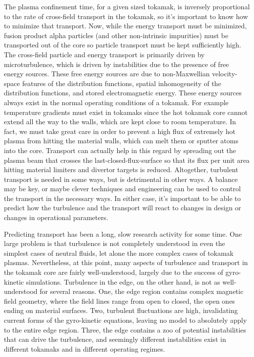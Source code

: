 The plasma confinement time, for a given sized tokamak, is inversely proportional to the rate of cross-field transport in the tokamak, so it's important to know how to minimize that
transport. Now, while the energy transport must be minimized, fusion product alpha particles (and other non-intrinsic impurities) must be transported out of the core so particle transport
must be kept sufficiently high. The cross-field particle and energy transport is primarily driven by microturbulence, which is driven by instabilities due to the presence of free energy sources.
These free energy sources are due to non-Maxwellian velocity-space features of the distribution functions, spatial inhomogeneity of the distribution functions, and stored electromagnetic energy.
These energy sources always exist in the normal operating conditions of a tokamak. For example temperature gradients must exist in tokamaks
since the hot tokamak core cannot extend all the way to the walls, which are kept close to room temperature. In fact, we must take great care in order to prevent a high flux of extremely
hot plasma from hitting the material walls, which can melt them or sputter atoms into the core. 
Transport can actually help in this regard by spreading out the plasma beam that crosses the last-closed-flux-surface so that its flux
per unit area hitting material limiters and divertor targets is reduced. Altogether, turbulent transport is needed in some ways, but is detrimental in other ways. A balance may be key,
or maybe clever techniques and engineering can be used to control the transport in the necessary ways. In either case, it's important to be able to predict how the turbulence and the
transport will react to changes in design or changes in operational parameters. 

Predicting transport has been a long, slow research activity for some time. One large problem is that turbulence is not completely understood in even the simplest cases of neutral fluids,
let alone the more complex cases of tokamak plasmas. Nevertheless, at this point, many aspects of turbulence and transport in the tokamak core are fairly well-understood, largely
due to the success of gyro-kinetic simulations. Turbulence in the edge, on the other hand, is not as well-understood for several reasons. One, the edge region contains complex magnetic
field geometry, where the field lines range from open to closed, the open ones ending on material surfaces. Two, turbulent fluctuations are high, invalidating current forms of the
gyro-kinetic equations, leaving no model to absolutely apply to the entire edge region. Three, the edge contains a zoo of potential instabilities that can drive the turbulence,
and seemingly different instabilities exist in different tokamaks and in different operating regimes.


